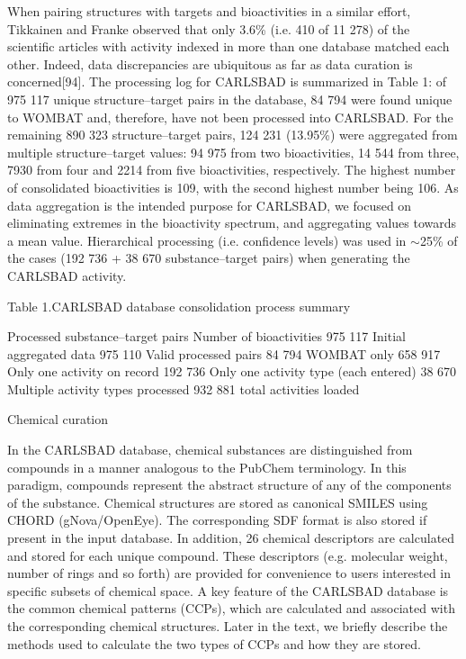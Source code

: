 When pairing structures with targets and bioactivities in a similar effort, Tikkainen and Franke observed that only 3.6\% (i.e. 410 of 11 278) of the scientific articles with activity indexed in more than one database matched each other. Indeed, data discrepancies are ubiquitous as far as data curation is concerned[94]. The processing log for CARLSBAD is summarized in Table 1: of 975 117 unique structure–target pairs in the database, 84 794 were found unique to WOMBAT and, therefore, have not been processed into CARLSBAD. For the remaining 890 323 structure–target pairs, 124 231 (13.95\%) were aggregated from multiple structure–target values: 94 975 from two bioactivities, 14 544 from three, 7930 from four and 2214 from five bioactivities, respectively. The highest number of consolidated bioactivities is 109, with the second highest number being 106. As data aggregation is the intended purpose for CARLSBAD, we focused on eliminating extremes in the bioactivity spectrum, and aggregating values towards a mean value. Hierarchical processing (i.e. confidence levels) was used in $\sim$25\% of the cases (192 736 + 38 670 substance–target pairs) when generating the CARLSBAD activity.

Table 1.CARLSBAD database consolidation process summary

Processed substance–target pairs	Number of bioactivities
975 117 	Initial aggregated data 
975 110 	Valid processed pairs 
84 794 	WOMBAT only 
658 917 	Only one activity on record 
192 736 	Only one activity type (each entered) 
38 670 	Multiple activity types processed 
932 881 	total activities loaded 

Chemical curation

In the CARLSBAD database, chemical substances are distinguished from compounds in a manner analogous to the PubChem terminology. In this paradigm, compounds represent the abstract structure of any of the components of the substance. Chemical structures are stored as canonical SMILES using CHORD (gNova/OpenEye). The corresponding SDF format is also stored if present in the input database. In addition, 26 chemical descriptors are calculated and stored for each unique compound. These descriptors (e.g. molecular weight, number of rings and so forth) are provided for convenience to users interested in specific subsets of chemical space. A key feature of the CARLSBAD database is the common chemical patterns (CCPs), which are calculated and associated with the corresponding chemical structures. Later in the text, we briefly describe the methods used to calculate the two types of CCPs and how they are stored.

